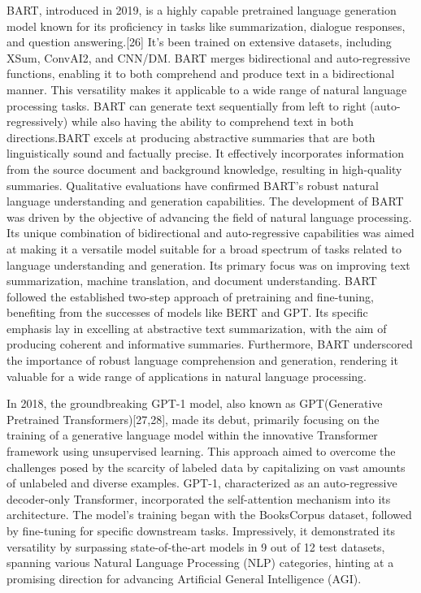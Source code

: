 \documentclass[conference]{IEEEtran}
\begin{document}
BART, introduced in 2019, is a highly capable pretrained language generation model known for its proficiency in tasks like summarization, dialogue responses, and question answering.[26] It's been trained on extensive datasets, including XSum, ConvAI2, and CNN/DM. BART merges bidirectional and auto-regressive functions, enabling it to both comprehend and produce text in a bidirectional manner. This versatility makes it applicable to a wide range of natural language processing tasks. BART can generate text sequentially from left to right (auto-regressively) while also having the ability to comprehend text in both directions.BART excels at producing abstractive summaries that are both linguistically sound and factually precise. It effectively incorporates information from the source document and background knowledge, resulting in high-quality summaries. Qualitative evaluations have confirmed BART's robust natural language understanding and generation capabilities.
The development of BART was driven by the objective of advancing the field of natural language processing. Its unique combination of bidirectional and auto-regressive capabilities was aimed at making it a versatile model suitable for a broad spectrum of tasks related to language understanding and generation. Its primary focus was on improving text summarization, machine translation, and document understanding. BART followed the established two-step approach of pretraining and fine-tuning, benefiting from the successes of models like BERT and GPT. Its specific emphasis lay in excelling at abstractive text summarization, with the aim of producing coherent and informative summaries. Furthermore, BART underscored the importance of robust language comprehension and generation, rendering it valuable for a wide range of applications in natural language processing.


In 2018, the groundbreaking GPT-1 model, also known as GPT(Generative Pretrained Transformers)[27,28], made its debut, primarily focusing on the training of a generative language model within the innovative Transformer framework using unsupervised learning. This approach aimed to overcome the challenges posed by the scarcity of labeled data by capitalizing on vast amounts of unlabeled and diverse examples. GPT-1, characterized as an auto-regressive decoder-only Transformer, incorporated the self-attention mechanism into its architecture. The model's training began with the BooksCorpus dataset, followed by fine-tuning for specific downstream tasks. Impressively, it demonstrated its versatility by surpassing state-of-the-art models in 9 out of 12 test datasets, spanning various Natural Language Processing (NLP) categories, hinting at a promising direction for advancing Artificial General Intelligence (AGI).
\end{document}
